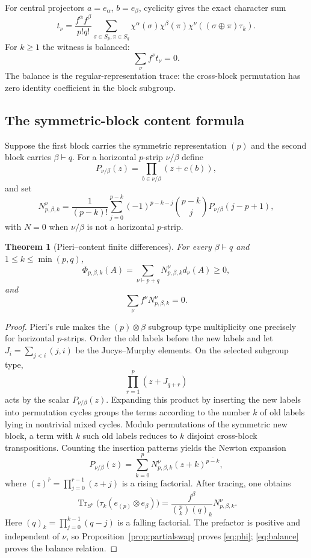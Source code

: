\documentclass[11pt]{article}
\newtheorem{theorem}{Theorem}[section]
\theoremstyle{definition}
\newcommand{\Tr}{\operatorname{Tr}}
\begin{document}
For central projectors $a=e_\alpha$, $b=e_\beta$, cyclicity gives the exact character sum
\begin{equation}\label{eq:centralcoeff}
 t_\nu=\frac{f^\alpha f^\beta}{p!q!}
 \sum_{\sigma\in S_p,\pi\in S_q}
 \chi^\alpha(\sigma)\chi^\beta(\pi)
 \chi^\nu((\sigma\oplus\pi)\tau_k).
\end{equation}
For $k\ge1$ the witness is balanced:
\begin{equation}\label{eq:balance}
 \sum_\nu f^\nu t_\nu=0.
\end{equation}
The balance is the regular-representation trace: the cross-block permutation has zero identity coefficient in the block subgroup.

\subsection{The symmetric-block content formula}
Suppose the first block carries the symmetric representation $(p)$ and the second block carries $\beta\vdash q$.  For a horizontal $p$-strip $\nu/\beta$ define
\[
 P_{\nu/\beta}(z)=\prod_{b\in\nu/\beta}(z+c(b)),
\]
and set
\begin{equation}\label{eq:Ndef}
 N^\nu_{p,\beta,k}=\frac1{(p-k)!}
 \sum_{j=0}^{p-k}(-1)^{p-k-j}\binom{p-k}{j}
 P_{\nu/\beta}(j-p+1),
\end{equation}
with $N=0$ when $\nu/\beta$ is not a horizontal $p$-strip.

\begin{theorem}[Pieri--content finite differences]\label{thm:pieri}
For every $\beta\vdash q$ and $1\le k\le\min(p,q)$,
\begin{equation}\label{eq:phi}
 \Phi_{p,\beta,k}(A)=\sum_{\nu\vdash p+q}N^\nu_{p,\beta,k}d_\nu(A)\ge0,
\end{equation}
and
\[
 \sum_\nu f^\nu N^\nu_{p,\beta,k}=0.
\]
\end{theorem}

\begin{proof}
Pieri's rule makes the $(p)\otimes\beta$ subgroup type multiplicity one precisely for horizontal $p$-strips.  Order the old labels before the new labels and let $J_i=\sum_{j<i}(j,i)$ be the Jucys--Murphy elements.  On the selected subgroup type,
\[
 \prod_{r=1}^p(z+J_{q+r})
\]
acts by the scalar $P_{\nu/\beta}(z)$.  Expanding this product by inserting the new labels into permutation cycles groups the terms according to the number $k$ of old labels lying in nontrivial mixed cycles.  Modulo permutations of the symmetric new block, a term with $k$ such old labels reduces to $k$ disjoint cross-block transpositions.  Counting the insertion patterns yields the Newton expansion
\[
 P_{\nu/\beta}(z)
 =\sum_{k=0}^pN^\nu_{p,\beta,k}(z+k)^{\overline{p-k}},
\]
where $(z)^{\overline r}=\prod_{j=0}^{r-1}(z+j)$ is a rising factorial.  After tracing, one obtains
\[
 \Tr_{S^\nu}\bigl(\tau_k(e_{(p)}\otimes e_\beta)\bigr)
 =\frac{f^\beta}{\binom pk(q)_k}N^\nu_{p,\beta,k}.
\]
Here $(q)_k=\prod_{j=0}^{k-1}(q-j)$ is a falling factorial.  The prefactor is positive and independent of $\nu$, so Proposition~\ref{prop:partialswap} proves \eqref{eq:phi}; \eqref{eq:balance} proves the balance relation.
\end{proof}
\end{document}
